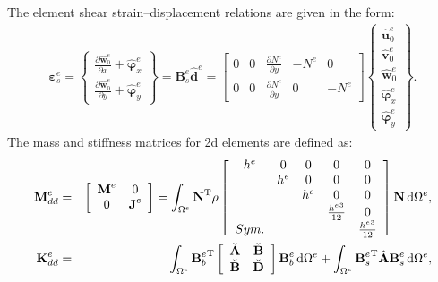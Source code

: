 The element shear strain--displacement relations are given in the form:
\begin{eqnarray}
	\boldsymbol{\varepsilon}_s^e = 
	\left \{ \begin{array}{c}
		\frac{\partial \widehat{\textbf{w}}_0^e}{\partial x} + \widehat{\boldsymbol{\varphi}}_x^e\\
		\frac{\partial \widehat{\textbf{w}}_0^e}{\partial y} + \widehat{\boldsymbol{\varphi}}_y^e
	\end{array} \right\} = 
	\textbf{B}_s^e\widehat{\textbf{d}}^e = 
	\left [
	\begin{array}{ccccc}
		0 & 0 & \frac{\partial N^e}{\partial y} & -N^e & 0\\
		0 & 0 & \frac{\partial N^e}{\partial y} & 0 & -N^e
	\end{array} \right]
	\left \{ \begin{array}{c}
		\widehat{\textbf{u}}_0^e \\
		\widehat{\textbf{v}}_0^e \\
		\widehat{\textbf{w}}_0^e \\
		\widehat{\boldsymbol{\varphi}}_x^e \\
		\widehat{\boldsymbol{\varphi}}_y^e
	\end{array} \right\}.
\end{eqnarray}
%
The mass and stiffness matrices for \ac{2d} elements are defined as:
\begin{eqnarray}
	\textbf{M}_{dd}^e & = &
	\left [
	\begin{array}{cc}
		\textbf{M}^e & 0\\
		0 & \textbf{J}^e
	\end{array}
	\right] =
	\int_{\Omega^e}\textbf{N}^{\mathrm{T}}\rho
	\left [
	\begin{array}{ccccc}
		h^e & 0 & 0 & 0 & 0 \\
		& h^e & 0 & 0 & 0 \\
		&  & h^e & 0 & 0\\
		&  &  & \frac{{h^e}^3}{12} & 0\\
		Sym. &  &  &  & \frac{{h^e}^3}{12}
	\end{array} \right]
	\textbf{N} \mathop{}\!\mathrm{d}\Omega^e,\\
	\textbf{K}_{dd}^e & = & \int_{\Omega^e}{\textbf{B}_b^e}^{\mathrm{T}}
	\left[
	\begin{array}{cc}
		\check{\textbf{A}} & \check{\textbf{B}}\\
		\check{\textbf{B}} & \check{\textbf{D}}
	\end{array} \right]
	\textbf{B}_b^e \mathop{}\!\mathrm{d} \Omega^e+\int_{\Omega^e}{\textbf{B}_s^e}^{\mathrm{T}}\hat{\textbf{A}}\textbf{B}_s^e\mathop{}\!\mathrm{d} \Omega^e,
\end{eqnarray}
